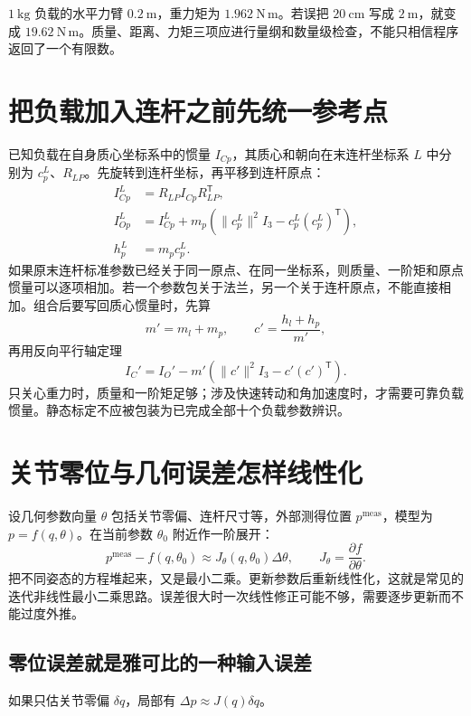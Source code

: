 \begin{examplebox}[算例 10C 单位错误怎样放大负载力矩]
$1\ \mathrm{kg}$ 负载的水平力臂 $0.2\ \mathrm m$，重力矩为 $1.962\ \mathrm{N\,m}$。若误把 $20\ \mathrm{cm}$ 写成 $2\ \mathrm m$，就变成 $19.62\ \mathrm{N\,m}$。质量、距离、力矩三项应进行量纲和数量级检查，不能只相信程序返回了一个有限数。
\end{examplebox}

\section{把负载加入连杆之前先统一参考点}
已知负载在自身质心坐标系中的惯量 $I_{Cp}$，其质心和朝向在末连杆坐标系 $L$ 中分别为 $c_p^L$、$R_{LP}$。先旋转到连杆坐标，再平移到连杆原点：
\begin{align}
 I_{Cp}^L&=R_{LP}I_{Cp}R_{LP}^{\mathsf T},\\
 I_{Op}^L&=I_{Cp}^L+m_p\left(\|c_p^L\|^2I_3-c_p^L(c_p^L)^{\mathsf T}\right),\\
 h_p^L&=m_pc_p^L.
\end{align}
如果原末连杆标准参数已经关于同一原点、在同一坐标系，则质量、一阶矩和原点惯量可以逐项相加。若一个参数包关于法兰，另一个关于连杆原点，不能直接相加。组合后要写回质心惯量时，先算
\[
 m'=m_l+m_p,\qquad c'=\frac{h_l+h_p}{m'},
\]
再用反向平行轴定理
\[
 I_C'=I_O'-m'\left(\|c'\|^2I_3-c'(c')^{\mathsf T}\right).
\]
只关心重力时，质量和一阶矩足够；涉及快速转动和角加速度时，才需要可靠负载惯量。静态标定不应被包装为已完成全部十个负载参数辨识。

\section{关节零位与几何误差怎样线性化}
设几何参数向量 $\theta$ 包括关节零偏、连杆尺寸等，外部测得位置 $p^{\mathrm{meas}}$，模型为 $p=f(q,\theta)$。在当前参数 $\theta_0$ 附近作一阶展开：
\begin{equation}
 p^{\mathrm{meas}}-f(q,\theta_0)\approx
 J_\theta(q,\theta_0)\Delta\theta,\qquad
 J_\theta=\frac{\partial f}{\partial\theta}.
\end{equation}
把不同姿态的方程堆起来，又是最小二乘。更新参数后重新线性化，这就是常见的迭代非线性最小二乘思路。误差很大时一次线性修正可能不够，需要逐步更新而不能过度外推。

\subsection{零位误差就是雅可比的一种输入误差}
如果只估关节零偏 $\delta q$，局部有 $\Delta p\approx J(q)\delta q$。

